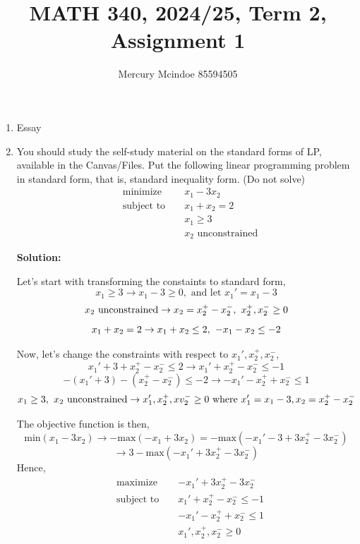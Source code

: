 \documentclass[12pt]{article}
\title{MATH 340, 2024/25, Term 2, Assignment 1}
\author{Mercury Mcindoe 85594505}
\newenvironment{solution}
  {\par\noindent\textbf{Solution:}\par}
  {\par}
\begin{document}
\maketitle 
\thispagestyle{empty}
  
\begin{enumerate}
  \item Essay

    \pagebreak

\item You should study the self-study material on the standard forms of LP, available in the Canvas/Files. Put the following linear programming problem in standard form, that is, standard inequality form. (Do not solve)
    \begin{align*}
    &\text{minimize } && x_1 - 3x_2 \\
    &\text{subject to } && x_1 + x_2 = 2 \\
    & && x_1 \ge 3 \\
    & && x_2 \text{ unconstrained}
\end{align*}

\begin{solution}
  Let's start with transforming the constaints to standard form,
  $$x_1 \ge 3 \to x_1 - 3 \ge 0, \text{ and let } x_1' = x_1 - 3$$
  $$x_2 \text{ unconstrained} \to x_2 = x_2^+ - x_2^-, \hspace{.05in} x_2^+, x_2^- \ge 0$$
  $$x_1 + x_2 = 2 \to x_1 + x_2 \le 2,\hspace{.05in} -x_1 - x_2 \le -2 $$
\end{solution}

Now, let's change the constraints with respect to $x_1',x_2^+,x_2^-$,
$$x_1' + 3 + x_2^+ - x_2^- \le 2 \to x_1' + x_2^+  - x_2^- \le -1$$
$$-(x_1' +3) -(x_2^+ - x_2^-) \le -2 \to -x_1' -x_2^+ + x_2^- \le 1 $$
$$x_1 \ge 3, \hspace{.05in} x_2 \text{ unconstrained} \to x_1' , x_2^+,xv_2^- \ge 0 \text{ where } x_1' = x_1-3,x_2 = x_2^+ -x_2^-$$

The objective function is then,
$$\text{min}(x_1-3x_2) \to -\text{max}(-x_1+3x_2) = -\text{max}(-x_1'-3 + 3x_2^+ -3x_2^-)$$
$$\to 3 - \text{max}(-x_1'+3x_2^+-3x_2^-)$$
Hence,
\begin{align*}
 &\text{maximize } && -x_1'+3x_2^+-3x_2^- \\
    &\text{subject to } && x_1' + x_2^+ - x_2^- \le -1 \\
    & && -x_1'-x_2^+ + x_2^- \le 1 \\
    & && x_1', x_2^+, x_2^- \ge 0 
\end{align*}



\end{enumerate}
\end{document}
